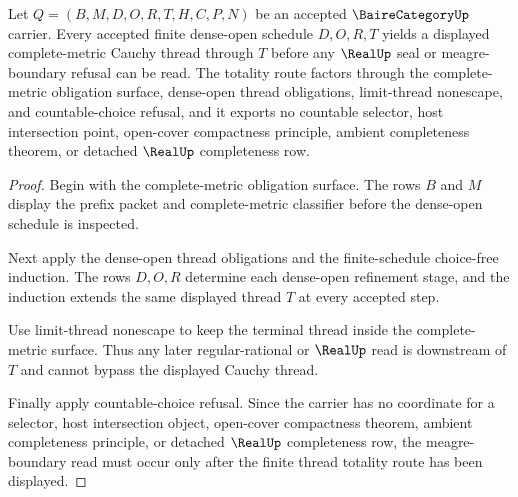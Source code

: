 \begin{theorem}
\label{thm:baire-category-dense-open-thread-totality}
Let $Q=(B,M,D,O,R,T,H,C,P,N)$ be an accepted $\BaireCategoryUp$ carrier. Every accepted finite dense-open schedule $D,O,R,T$ yields a displayed complete-metric Cauchy thread through $T$ before any $\RealUp$ seal or meagre-boundary refusal can be read. The totality route factors through the complete-metric obligation surface, dense-open thread obligations, limit-thread nonescape, and countable-choice refusal, and it exports no countable selector, host intersection point, open-cover compactness principle, ambient completeness theorem, or detached $\RealUp$ completeness row.
\end{theorem}
\begin{proof}
Begin with the complete-metric obligation surface. The rows $B$ and $M$ display the prefix packet and complete-metric classifier before the dense-open schedule is inspected.

Next apply the dense-open thread obligations and the finite-schedule choice-free induction. The rows $D,O,R$ determine each dense-open refinement stage, and the induction extends the same displayed thread $T$ at every accepted step.

Use limit-thread nonescape to keep the terminal thread inside the complete-metric surface. Thus any later regular-rational or $\RealUp$ read is downstream of $T$ and cannot bypass the displayed Cauchy thread.

Finally apply countable-choice refusal. Since the carrier has no coordinate for a selector, host intersection object, open-cover compactness theorem, ambient completeness principle, or detached $\RealUp$ completeness row, the meagre-boundary read must occur only after the finite thread totality route has been displayed.
\end{proof}

